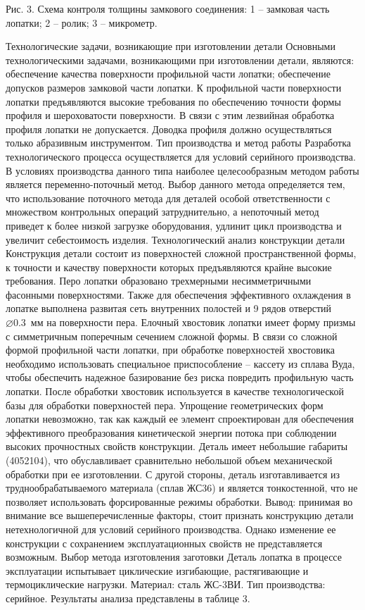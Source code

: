 Рис. 3. Схема контроля толщины замкового соединения: 1 – замковая часть лопатки; 2 – ролик; 3 – микрометр.

Технологические задачи, возникающие при изготовлении детали
Основными технологическими задачами, возникающими при изготовлении детали, являются:
обеспечение качества поверхности профильной части лопатки;
обеспечение допусков размеров замковой части лопатки.
К профильной части поверхности лопатки предъявляются высокие требования по обеспечению точности формы профиля и шероховатости поверхности. В связи с этим лезвийная обработка профиля лопатки не допускается. Доводка профиля должно осуществляться только абразивным инструментом.
Тип производства и метод работы
Разработка технологического процесса осуществляется для условий серийного производства. В условиях производства данного типа наиболее целесообразным методом работы является переменно-поточный метод.
Выбор данного метода определяется тем, что использование поточного метода для деталей особой ответственности с множеством контрольных операций затруднительно, а непоточный метод приведет к более низкой загрузке оборудования, удлинит цикл производства и увеличит себестоимость изделия.
Технологический анализ конструкции детали
Конструкция детали состоит из поверхностей сложной пространственной формы, к точности и качеству поверхности которых предъявляются крайне высокие требования.
Перо лопатки образовано трехмерными несимметричными фасонными поверхностями. Также для обеспечения эффективного охлаждения в лопатке выполнена развитая сеть внутренних полостей и 9 рядов отверстий ⌀0.3 мм на поверхности пера.
Елочный хвостовик лопатки имеет форму призмы с симметричным поперечным сечением сложной формы. В связи со сложной формой профильной части лопатки, при обработке поверхностей хвостовика необходимо использовать специальное приспособление – кассету из сплава Вуда, чтобы обеспечить надежное базирование без риска повредить профильную часть лопатки.
После обработки хвостовик используется в качестве технологической базы для обработки поверхностей пера.
Упрощение геометрических форм лопатки невозможно, так как каждый ее элемент спроектирован для обеспечения эффективного преобразования кинетической энергии потока при соблюдении высоких прочностных свойств конструкции.
Деталь имеет небольшие габариты (4052104), что обуславливает сравнительно небольшой объем механической обработки при ее изготовлении. С другой стороны, деталь изготавливается из труднообрабатываемого материала (сплав ЖС36) и является тонкостенной, что не позволяет использовать форсированные режимы обработки.
Вывод: принимая во внимание все вышеперечисленные факторы, стоит признать конструкцию детали нетехнологичной для условий серийного производства. Однако изменение ее конструкции с сохранением эксплуатационных свойств не представляется возможным.
Выбор метода изготовления заготовки
Деталь лопатка в процессе эксплуатации испытывает циклические изгибающие, растягивающие и термоциклические нагрузки. Материал: сталь ЖС-3ВИ. Тип производства: серийное.
Результаты анализа представлены в таблице 3.






